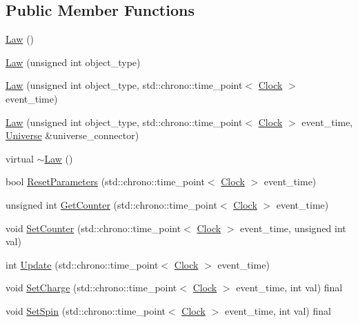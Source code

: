 \subsection*{Public Member Functions}
\begin{DoxyCompactItemize}
\item 
\hyperlink{class_law_a3b94b6e9f09b8f457dba70f3b1c1ab43}{Law} ()
\item 
\hyperlink{class_law_afd1730474b2806ec6665e16419f4994c}{Law} (unsigned int object\+\_\+type)
\item 
\hyperlink{class_law_afdc75daa3a3346c473454c7a4dc2eab5}{Law} (unsigned int object\+\_\+type, std\+::chrono\+::time\+\_\+point$<$ \hyperlink{universe_8h_a0ef8d951d1ca5ab3cfaf7ab4c7a6fd80}{Clock} $>$ event\+\_\+time)
\item 
\hyperlink{class_law_aa4fb7baf54aa77720605fd601fb80b8d}{Law} (unsigned int object\+\_\+type, std\+::chrono\+::time\+\_\+point$<$ \hyperlink{universe_8h_a0ef8d951d1ca5ab3cfaf7ab4c7a6fd80}{Clock} $>$ event\+\_\+time, \hyperlink{class_universe}{Universe} \&universe\+\_\+connector)
\item 
virtual \hyperlink{class_law_a4fa6f0fb61285152c8c6d7a17b51a82b}{$\sim$\+Law} ()
\item 
bool \hyperlink{class_law_a56541ec0b82b8a7c377ae2e6b444205c}{Reset\+Parameters} (std\+::chrono\+::time\+\_\+point$<$ \hyperlink{universe_8h_a0ef8d951d1ca5ab3cfaf7ab4c7a6fd80}{Clock} $>$ event\+\_\+time)
\item 
unsigned int \hyperlink{class_law_ab30a86ef88a85e13d3e598caa45bff05}{Get\+Counter} (std\+::chrono\+::time\+\_\+point$<$ \hyperlink{universe_8h_a0ef8d951d1ca5ab3cfaf7ab4c7a6fd80}{Clock} $>$ event\+\_\+time)
\item 
void \hyperlink{class_law_a408c401c8a44870c29ba9d08b45cb40f}{Set\+Counter} (std\+::chrono\+::time\+\_\+point$<$ \hyperlink{universe_8h_a0ef8d951d1ca5ab3cfaf7ab4c7a6fd80}{Clock} $>$ event\+\_\+time, unsigned int val)
\item 
int \hyperlink{class_law_a0240b10c679b671039dbf10771342ea7}{Update} (std\+::chrono\+::time\+\_\+point$<$ \hyperlink{universe_8h_a0ef8d951d1ca5ab3cfaf7ab4c7a6fd80}{Clock} $>$ event\+\_\+time)
\item 
void \hyperlink{class_law_a2e780573f6285f88d167d45a2e243d01}{Set\+Charge} (std\+::chrono\+::time\+\_\+point$<$ \hyperlink{universe_8h_a0ef8d951d1ca5ab3cfaf7ab4c7a6fd80}{Clock} $>$ event\+\_\+time, int val) final
\item 
void \hyperlink{class_law_a3de75edea5e20db0a7b731de61f07dea}{Set\+Spin} (std\+::chrono\+::time\+\_\+point$<$ \hyperlink{universe_8h_a0ef8d951d1ca5ab3cfaf7ab4c7a6fd80}{Clock} $>$ event\+\_\+time, int val) final

\end{DoxyCompactItemize}
